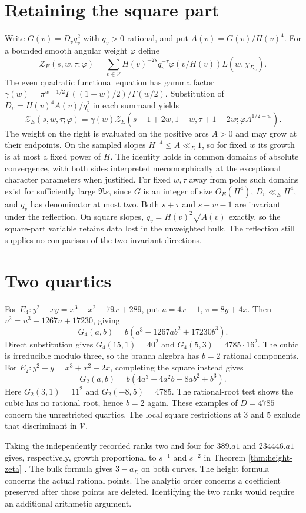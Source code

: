 \documentclass[11pt]{article}
\newcommand{\calV}{\mathcal{V}}
\begin{document}
\section{Retaining the square part}
Write $G(v)=D_v q_v^2$ with $q_v>0$ rational, and put
$A(v)=G(v)/H(v)^4$. For a bounded smooth angular weight $\varphi$ define
\[
 \mathcal Z_E(s,w,\tau;\varphi)=
 \sum_{v\in\calV} H(v)^{-2s}q_v^{-\tau}
 \varphi(v/H(v))L(w,\chi_{D_v}).
\]
The even quadratic functional equation has gamma factor
$\gamma(w)=\pi^{w-1/2}\Gamma((1-w)/2)/\Gamma(w/2)$. Substitution of
$D_v=H(v)^4 A(v)/q_v^2$ in each summand yields
\[
 \mathcal Z_E(s,w,\tau;\varphi)=\gamma(w)
 \mathcal Z_E(s-1+2w,1-w,\tau+1-2w;\varphi A^{1/2-w}).
\]
The weight on the right is evaluated on the positive arcs $A>0$ and may grow at their endpoints. On the sampled slopes $H^{-4}\le A\ll_E1$, so for fixed $w$ its growth is at most a fixed power of $H$. The identity holds in common domains of absolute convergence, with both sides
interpreted meromorphically at the exceptional character parameters when
justified. For fixed $w,\tau$ away from poles such domains exist for
sufficiently large $\Re s$, since $G$ is an integer of size $O_E(H^4)$,
$D_v\ll_E H^4$, and $q_v$ has denominator at most two. Both $s+\tau$
and $s+w-1$ are invariant under the reflection. On square slopes,
$q_v=H(v)^2\sqrt{A(v)}$ exactly, so the square-part variable retains
data lost in the unweighted bulk. The reflection still supplies no
comparison of the two invariant directions.

\section{Two quartics}\label{sec:examples}
For $E_4:y^2+xy=x^3-x^2-79x+289$, put $u=4x-1$, $v=8y+4x$.
Then $v^2=u^3-1267u+17230$, giving
\[
 G_4(a,b)=b(a^3-1267ab^2+17230b^3).
\]
Direct substitution gives $G_4(15,1)=40^2$ and
$G_4(5,3)=4785\cdot16^2$. The cubic is irreducible modulo three,
so the branch algebra has $b=2$ rational components.
For $E_2:y^2+y=x^3+x^2-2x$, completing the square instead gives
\[
 G_2(a,b)=b(4a^3+4a^2b-8ab^2+b^3).
\]
Here $G_2(3,1)=11^2$ and $G_2(-8,5)=4785$. The rational-root test
shows the cubic has no rational root, hence $b=2$ again. These
examples of $D=4785$ concern the unrestricted quartics. The local
square restrictions at $3$ and $5$ exclude that discriminant in $\calV$.

Taking the independently recorded ranks two and four for $389.a1$ and
$234446.a1$ gives, respectively, growth proportional to $s^{-1}$ and
$s^{-2}$ in Theorem \ref{thm:height-zeta} \cite{curves}. The bulk formula
gives $3-a_E$ on both curves. The height formula concerns the actual
rational points. The analytic order concerns a coefficient preserved
after those points are deleted. Identifying the two ranks would require
an additional arithmetic argument.
\end{document}
